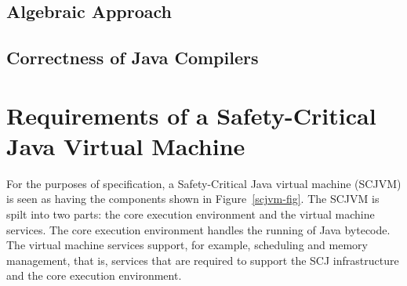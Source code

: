 \documentclass[a4paper,10pt]{article}
\begin{document}

\subsection{Algebraic Approach}
\label{algebraic-sec}

\subsection{Correctness of Java Compilers}
\label{java-correctness-sec}

\section{Requirements of a Safety-Critical Java Virtual Machine}
\label{requirements-sec}

For the purposes of specification, a Safety-Critical Java virtual machine
(SCJVM) is seen as having the components shown in Figure~\ref{scjvm-fig}. The
SCJVM is spilt into two parts: the core execution environment and the virtual
machine services. The core execution environment handles the running of Java
bytecode.  The virtual machine services support, for example, scheduling and
memory management, that is, services that are required to support the SCJ
infrastructure and the core execution environment.
\end{document}
